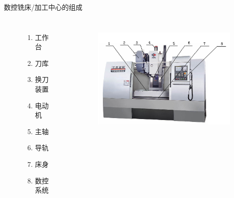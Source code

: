 \documentclass[UTF8,zihao=-4]{ctexbeamer}
\begin{document}
\begin{frame}{数控铣床/加工中心的组成}
\begin{columns}
	\begin{figure}
	\begin{enumerate}	
		\item 工作台 
		\item 刀库 
		\item 换刀装置 
		\item 电动机 
		\item 主轴 
		\item 导轨 
		\item 床身 
		\item 数控系统
	\end{enumerate}
	\end{figure}
	\begin{figure}
		\centering
		\includegraphics[width= 0.8\linewidth]{image/1-9}
		\label{fig:1-9}
	\end{figure}
\end{columns}
\end{frame}
\end{document}

